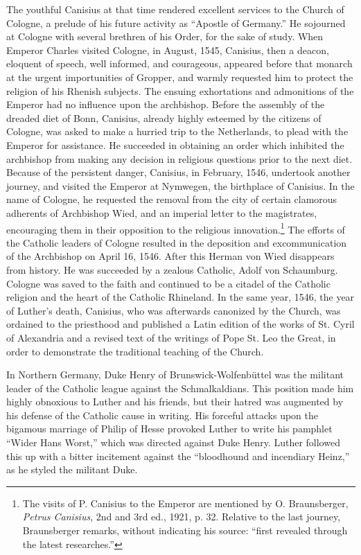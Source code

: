 The youthful Canisius at that time rendered excellent services to
the Church of Cologne, a prelude of his future activity as “Apostle
of Germany.” He sojourned at Cologne with several brethren of his
Order, for the sake of study. When Emperor Charles visited Cologne,
in August, 1545, Canisius, then a deacon, eloquent of speech, well
informed, and courageous, appeared before that monarch at the urgent importunities
of Gropper, and warmly requested him to protect
the religion of his Rhenish subjects. The ensuing exhortations and admonitions
of the Emperor had no influence upon the archbishop.
Before the assembly of the dreaded diet of Bonn, Canisius, already
highly esteemed by the citizens of Cologne, was asked to make a
hurried trip to the Netherlands, to plead with the Emperor for assistance.
He succeeded in obtaining an order which inhibited the archbishop from
making any decision in religious questions prior to the
next diet. Because of the persistent danger, Canisius, in February,
1546, undertook another journey, and visited the Emperor at Nymwegen,
the birthplace of Canisius. In the name of Cologne, he requested
the removal from the city of certain clamorous adherents of
Archbishop Wied, and an imperial letter to the magistrates, encouraging
them in their opposition to the religious innovation.\footnote
{The visits of P. Canisius to the Emperor are mentioned by O. Braunsberger, \textit{Petrus
Canisius}, 2nd and 3rd ed., 1921, p. 32. Relative to the last journey, Braunsberger remarks,
without indicating his source: “first revealed through the latest researches.”}
The efforts
of the Catholic leaders of Cologne resulted in the deposition and excommunication
of the Archbishop on April 16, 1546. After this
Herman von Wied disappears from history. He was succeeded by a
zealous Catholic, Adolf von Schaumburg. Cologne was saved to
the faith and continued to be a citadel of the Catholic religion and
the heart of the Catholic Rhineland. In the same year, 1546, the year
of Luther’s death, Canisius, who was afterwards canonized by the
Church, was ordained to the priesthood and published a Latin edition
of the works of St. Cyril of Alexandria and a revised text of the
writings of Pope St. Leo the Great, in order to demonstrate the traditional
teaching of the Church.

In Northern Germany, Duke Henry of Brunswick-Wolfenbüttel
was the militant leader of the Catholic league against the Schmalkaldians.
This position made him highly obnoxious to Luther and his
friends, but their hatred was augmented by his defense of the Catholic
cause in writing. His forceful attacks upon the bigamous marriage
of Philip of Hesse provoked Luther to write his pamphlet
“Wider Hans Worst,” which was directed against Duke Henry.
Luther followed this up with a bitter incitement against the “bloodhound
and incendiary Heinz,” as he styled the militant Duke.


